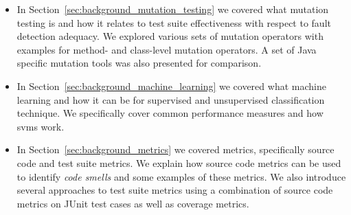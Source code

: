 \begin{itemize}
  \item In Section~\ref{sec:background_mutation_testing} we covered what mutation testing is and how it relates to test suite effectiveness with respect to fault detection adequacy. We explored various sets of mutation operators with examples for method- and class-level mutation operators. A set of Java specific mutation tools was also presented for comparison.
  \item In Section~\ref{sec:background_machine_learning} we covered what machine learning and how it can be for supervised and unsupervised classification technique. We specifically cover common performance measures and how \gls{svm}s work.
  \item In Section~\ref{sec:background_metrics} we covered metrics, specifically source code and test suite metrics. We explain how source code metrics can be used to identify \emph{code smells} and some examples of these metrics. We also introduce several approaches to test suite metrics using a combination of source code metrics on JUnit test cases as well as coverage metrics.
\end{itemize}
